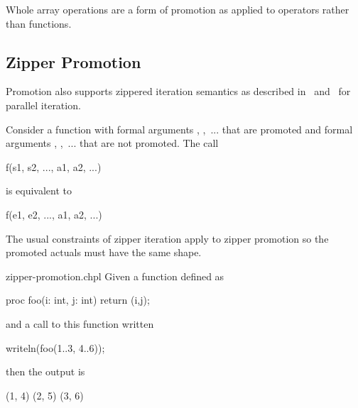 
Whole array operations are a form of promotion as applied to operators
rather than functions.


\subsection{Zipper Promotion}
\label{Zipper_Promotion}

Promotion also supports zippered iteration semantics as described
in~ and~ for parallel
iteration.

Consider a function  with formal
arguments , ,~... that are promoted and formal
arguments , ,~... that are not promoted.  The call
\begin{chapel}
f(s1, s2, ..., a1, a2, ...)
\end{chapel}
is equivalent to
\begin{chapel}
[(e1, e2, ...) in zip(s1, s2, ...)] f(e1, e2, ..., a1, a2, ...)
\end{chapel}
The usual constraints of zipper iteration apply to zipper promotion so
the promoted actuals must have the same shape.

\begin{chapelexample}{zipper-promotion.chpl}
Given a function defined as
\begin{chapel}
proc foo(i: int, j: int) {
  return (i,j);
}
\end{chapel}
and a call to this function written
\begin{chapel}
writeln(foo(1..3, 4..6));
\end{chapel}
then the output is
\begin{chapelprintoutput}{}
(1, 4) (2, 5) (3, 6)
\end{chapelprintoutput}
\end{chapelexample}

